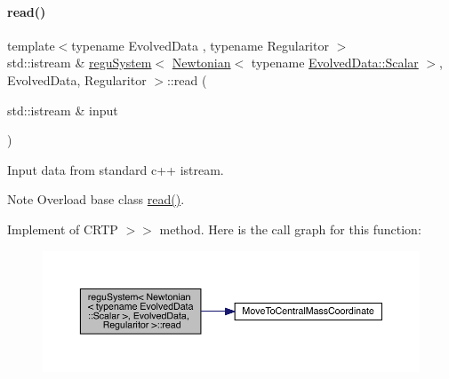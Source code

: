 \paragraph{\texorpdfstring{read()}{read()}}
{\footnotesize\ttfamily template$<$typename Evolved\+Data , typename Regularitor $>$ \\
std\+::istream \& \mbox{\hyperlink{classregu_system}{regu\+System}}$<$ \mbox{\hyperlink{class_newtonian}{Newtonian}}$<$ typename \mbox{\hyperlink{classregu_system_aca8ee2c387943164ee3ea68370fc3ac0}{Evolved\+Data\+::\+Scalar}} $>$, Evolved\+Data, Regularitor $>$\+::read (\begin{DoxyParamCaption}\item[{std\+::istream \&}]{input }\end{DoxyParamCaption})}



Input data from standard c++ istream. 

\begin{DoxyNote}{Note}
Overload base class \mbox{\hyperlink{classregu_system_3_01_newtonian_3_01typename_01_evolved_data_1_1_scalar_01_4_00_01_evolved_data_00_01_regularitor_01_4_a0cfd66a24e4b23158a6450510c40ab31}{read()}}.
\end{DoxyNote}
Implement of C\+R\+TP \textquotesingle{}$>$$>$\textquotesingle{} method. Here is the call graph for this function\+:\nopagebreak
\begin{figure}[H]
\begin{center}
\leavevmode
\includegraphics[width=350pt]{classregu_system_3_01_newtonian_3_01typename_01_evolved_data_1_1_scalar_01_4_00_01_evolved_data_00_01_regularitor_01_4_a0cfd66a24e4b23158a6450510c40ab31_cgraph}
\end{center}
\end{figure}
\mbox{\label{classregu_system_3_01_newtonian_3_01typename_01_evolved_data_1_1_scalar_01_4_00_01_evolved_data_00_01_regularitor_01_4_a168315b01bf058c43a97b0d364a5f649}} 
